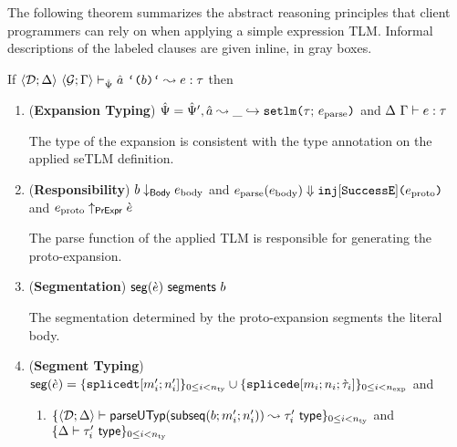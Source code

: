 \documentclass[acmsmall,screen]{acmart}
\begin{document}
The following theorem summarizes the abstract reasoning principles that client programmers can rely on when applying a simple expression TLM. Informal descriptions of the labeled clauses are given inline, in gray boxes.
\noindent
\begin{theorem}\label{thm:setlm-reasoning} If $\expandsU{\uDD{\uD}{\Delta}}{\uGG{\uG}{\Gamma}}{\uPsi}{\utsmap{\tsmv}{b}}{e}{\tau}$ then
\begin{enumerate}[nolistsep,leftmargin=10pt,label={\arabic*.}]
\item (\textbf{Expansion Typing}) $\hat{\Psi} = \hat{\Psi}', \hat{a} \leadsto \_ \hookrightarrow \texttt{setlm}\texttt{(}\tau;\,e_\text{parse}\texttt{)}$ and $\Delta~\Gamma \vdash e : \tau$ 
  \begin{grayparbox}
     The type of the expansion is consistent with the type annotation on the applied seTLM definition.
  \end{grayparbox}
\item (\textbf{Responsibility}) $b \downarrow_\mathsf{Body} e_\text{body}$ and $e_\text{parse}(e_\text{body}) \Downarrow \texttt{inj}[\mathtt{SuccessE}]\texttt{(}e_\text{proto}\texttt{)}$ and $e_\text{proto} \uparrow_\mathsf{PrExpr} \grave{e}$
  \begin{grayparbox}
  The parse function of the applied TLM is responsible for generating the proto-expansion.
  \end{grayparbox}
\item (\textbf{Segmentation}) $\mathsf{seg}(\grave{e})~\mathsf{segments}~b$ 
          \begin{grayparbox}
        The segmentation determined by the proto-expansion segments the literal body.
          \end{grayparbox}
\item (\textbf{Segment Typing})  $\mathsf{seg}(\grave{e}) = \{\texttt{splicedt}[m'_i; n'_i]\}_{0 \leq i < n_\text{ty}} \cup \{\texttt{splicede}[m_i; n_i; \grave{\tau}_i]\}_{0 \leq i < n_\text{exp}}$ and
  \begin{enumerate}
  \item $\{
        \langle \mathcal{D}; \Delta \rangle \vdash 
          \mathsf{parseUTyp}(\mathsf{subseq}(b; m'_i; n'_i))
         \leadsto \tau'_i~\mathsf{type}
      \}_{0 \leq i < n_\text{ty}}$ and $\{\Delta \vdash \tau'_i~\mathsf{type}\}_{0 \leq i < n_\text{ty}}$
          \begin{grayparbox}


\end{grayparbox}
\end{enumerate}
\end{enumerate}
\end{theorem}
\end{document}
